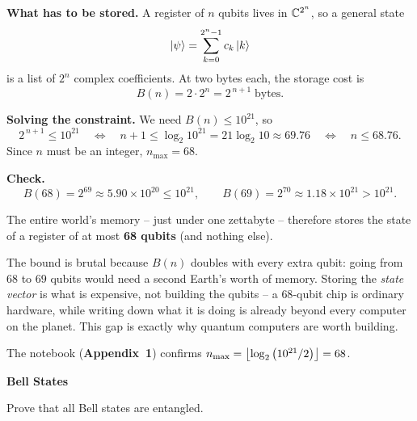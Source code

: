 \documentclass[a4paper, 10pt]{article}
\begin{document}
\begin{solution}
	\noindent \textbf{What has to be stored.} A register of \( n \) qubits lives in \( \mathbb{C}^{2^n} \), so a general state
	\[
		\ket{\psi} = \sum_{k = 0}^{2^n - 1} c_k \ket{k}
	\]
	is a list of \( 2^n \) complex coefficients. At two bytes each, the storage cost is
	\[
		B(n) = 2 \cdot 2^n = 2^{\,n+1} \; \text{bytes}.
	\]

	\myspace

	\noindent \textbf{Solving the constraint.} We need \( B(n) \le 10^{21} \), so
	\[
		2^{\,n+1} \le 10^{21}
		\quad\Longleftrightarrow\quad
		n + 1 \le \log_2 10^{21} = 21 \log_2 10 \approx 69.76
		\quad\Longleftrightarrow\quad
		n \le 68.76 .
	\]
	Since \( n \) must be an integer, \( n_{\max} = 68 \).

	\myspace

	\noindent \textbf{Check.}
	\[
		B(68) = 2^{69} \approx 5.90 \times 10^{20} \le 10^{21}, \qquad
		B(69) = 2^{70} \approx 1.18 \times 10^{21} > 10^{21} .
	\]

	\noindent The entire world's memory -- just under one zettabyte -- therefore stores the state of a register of at most \textbf{68 qubits} (and nothing else).

	\begin{remark}
		The bound is brutal because \( B(n) \) doubles with every extra qubit: going from \( 68 \) to \( 69 \) qubits would need a second Earth's worth of memory.
		Storing the \emph{state vector} is what is expensive, not building the qubits -- a \( 68 \)-qubit chip is ordinary hardware, while writing down what it is doing is already beyond every computer on the planet.
		This gap is exactly why quantum computers are worth building.
	\end{remark}

	\noindent The notebook (\textbf{Appendix~1}) confirms \( n_{\max} = \left\lfloor \log_2 \left(10^{21} / 2\right) \right\rfloor = 68 \).
\end{solution}
\begin{problem}
\textbf{Bell States}
\par Prove that all Bell states are entangled.
\end{problem}
\end{document}
